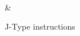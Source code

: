 \begin{figure}[h]
	\centering
	\begin{bytefield}[bitwidth=0.03\linewidth]{32}
		 \\
		 &
	\end{bytefield}

	\caption{J-Type instructions}
	\label{fig:jtype_format}
\end{figure}
